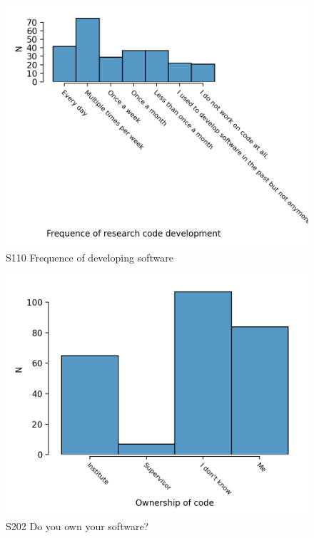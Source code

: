\documentclass{article}
\begin{document}
\begin{figure}[!p]
    \centering
    \includegraphics[width=\textwidth]{../figs/S110.png}
	\caption{S110 Frequence of developing software}
    \label{fig:S110}
\end{figure}

\begin{figure}[!p]
    \centering
    \includegraphics[width=\textwidth]{../figs/S202.png}
	\caption{S202 Do you own your software?}
    \label{fig:S202}
\end{figure}

%
%
%
%
%
%
\end{document}
